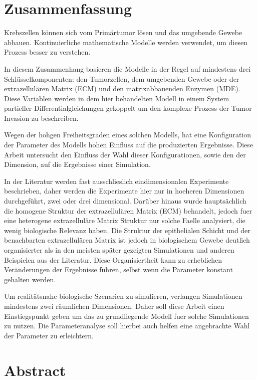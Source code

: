 \section*{Zusammenfassung}

Krebszellen können sich vom Primärtumor lösen und das umgebende Gewebe abbauen. 
Kontinuierliche mathematische Modelle werden verwendet, um diesen Prozess besser zu verstehen.

In diesem Zusammenhang basieren die Modelle in der Regel auf mindestens drei Schlüsselkomponenten: den Tumorzellen, dem umgebenden Gewebe oder der extrazellulären Matrix (ECM) und den matrixabbauenden Enzymen (MDE). Diese Variablen werden in dem hier behandelten Modell in einem System partieller Differentialgleichungen gekoppelt um den komplexe Prozess der Tumor Invasion zu beschreiben.

Wegen der hohgen Freiheitsgraden eines solchen Modells, hat eine Konfiguration der Parameter des Modells hohen Einfluss auf die produzierten Ergebnisse. Diese Arbeit untersucht den Einfluss der Wahl dieser Konfigurationen, sowie den der Dimension, auf die Ergebnisse einer Simulation.

In der Literatur werden fast ausschlieslich eindimensionalen Experimente beschrieben, daher werden die Experimente hier nur in hoeheren Dimensionen durchgeführt, zwei oder drei dimensional. Darüber hinaus wurde hauptsächlich die homogene Struktur der extrazellulären Matrix (ECM) behandelt, jedoch fuer eine heterogene extrazelluläre Matrix Struktur nur solche Faelle analysiert, die wenig biologische Relevanz haben. Die Struktur der epithelialen Schicht und der benachbarten extrazellulären Matrix ist jedoch in biologischem Gewebe deutlich organisierter als in den meisten später gezeigten Simulationen und anderen Beispielen aus der Literatur. Diese Organisiertheit kann zu erheblichen Veränderungen der Ergebnisse führen, selbst wenn die Parameter konstant gehalten werden.

Um realitätsnahe biologische Szenarien zu simulieren, verlangen Simulationen mindestens zwei räumlichen Dimensionen. Daher soll diese Arbeit einen Einstiegspunkt geben um das zu grundliegende Modell fuer solche Simulationen zu nutzen. Die Parameteranalyse soll hierbei auch helfen eine angebrachte Wahl der Parameter zu erleichtern.

\clearpage
\section*{Abstract}


